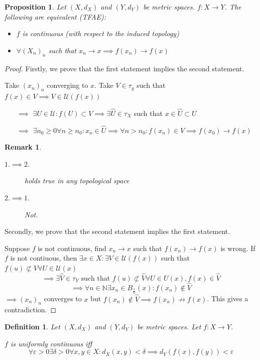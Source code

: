 \documentclass[a4paper]{article}
\newcounter{lecref}[section]
\numberwithin{lecref}{section}
\newtheorem{definition}[lecref]{Definition}
\newtheorem*{Remark}{Remark}
\newtheorem{proposition}[lecref]{Proposition}
\begin{document}
\begin{proposition}
	\label{proposition:1.15}
	Let $(X, d_X)$ and $(Y, d_Y)$ be metric spaces. $f: X \to Y$. The following are equivalent (TFAE):
	\begin{itemize}
		\item $f$ is continuous (with respect to the induced topology)
		\item $\forall (X_n)_n$ such that $x_n \to x \implies f(x_n) \to f(x)$
	\end{itemize}
\end{proposition}
\begin{proof}
	Firstly, we prove that the first statement implies the second statement.

	Take $(x_n)_n$ converging to $x$. Take $V \in \tau_y$ such that $f(x) \in V \implies V \in \mathcal U(f(x))$
	\begin{enumerate}
		\item[$\implies$] $\exists U \in \mathcal U: f(U) \subset V \implies \exists \hat U \in \tau_X$ such that $x \in \hat U \subset U$
		\item[$\implies$] $\exists n_0 \geq 0 \forall n \geq n_0: x_n \in \hat U \implies \forall n > n_0: f(x_n) \in V \implies f(x_0) \to f(x)$
	\end{enumerate}

	\begin{Remark}
		\begin{description}
			\item[$1. \implies 2.$] holds true in any topological space
			\item[$2. \implies 1.$] Not.
		\end{description}
	\end{Remark}

	Secondly, we prove that the second statement implies the first statement.

	Suppose $f$ is not continuous, find $x_n \to x$ such that $f(x_n) \to f(x)$ is wrong.
	If $f$ is not contiuous, then $\exists x \in X: \exists V \in \mathcal U(f(x))$ such that $f(u) \not\subset V \forall U \in \mathcal U(x)$
	\[ \implies \exists \hat V \in \tau_Y \text{ such that } f(u) \not\subset \hat V \forall U \in U(x), f(x) \in \hat V \]
	\[ \implies \forall n \in \mathbb N \exists x_n \in B_{\frac1n}(x): f(x_n) \not\in \hat V \]
	$\implies (x_n)_n$ converges to $x$ but $f(x_n) \not\in \hat V \implies f(x_n) \not\to f(x)$. This gives a contradiction.
\end{proof}

\begin{definition}
	\label{definition:1.16}
	Let $(X, d_X)$ and $(Y, d_Y)$ be metric spaces. Let $f: X \to Y$.

	$f$ is \emph{uniformly continuous} iff
	\[ \forall \varepsilon > 0 \exists \delta > 0 \forall x, y \in X: d_X(x, y) < \delta \implies d_Y(f(x), f(y)) < \varepsilon \]
\end{definition}
\end{document}
